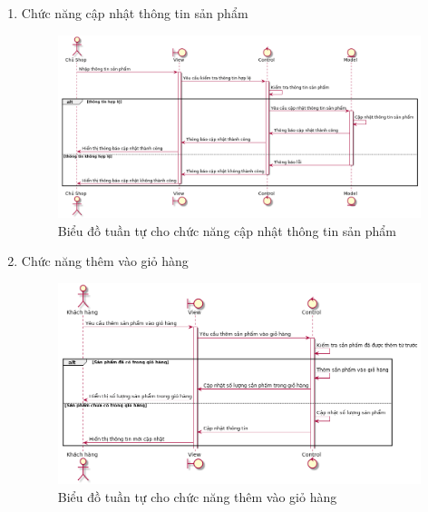 \begin{enumerate}[label=\textbf{\alph*)}]
    \item Chức năng cập nhật thông tin sản phẩm
    \begin{figure}[h!]
        \includegraphics[scale=0.4]{fig/s_update_product_info.png}
        \caption{Biểu đồ tuần tự cho chức năng cập nhật thông tin sản phẩm}
    \end{figure}
    \item Chức năng thêm vào giỏ hàng
    \begin{figure}[h!]
        \includegraphics[scale=0.45]{fig/s_add_to_cart.png}
        \caption{Biểu đồ tuần tự cho chức năng thêm vào giỏ hàng}
    \end{figure}
\end{enumerate}
\newpage
